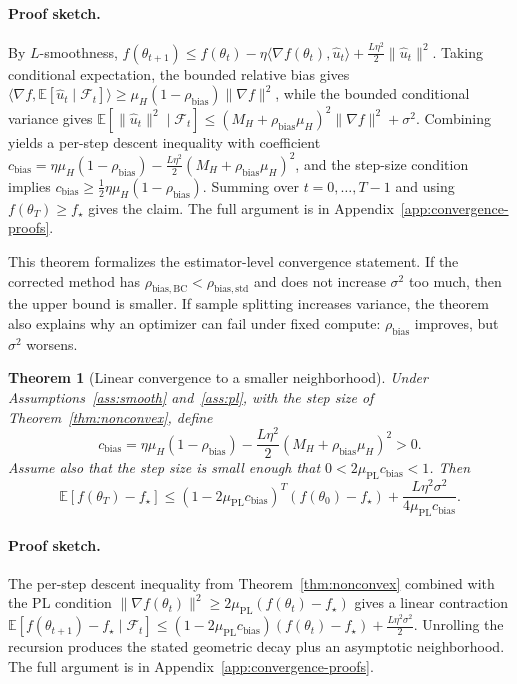\documentclass{article}
\newcommand{\E}{\mathbb{E}}
\newtheorem{theorem}{Theorem}
\begin{document}
\paragraph{Proof sketch.}
By $L$-smoothness, $f(\theta_{t+1})\le f(\theta_t)-\eta\langle\nabla f(\theta_t),\hat u_t\rangle+\frac{L\eta^2}{2}\|\hat u_t\|^2$. Taking conditional expectation, the bounded relative bias gives $\langle\nabla f,\E[\hat u_t\mid\mathcal F_t]\rangle\ge\mu_H(1-\rho_{\mathrm{bias}})\|\nabla f\|^2$, while the bounded conditional variance gives $\E[\|\hat u_t\|^2\mid\mathcal F_t]\le(M_H+\rho_{\mathrm{bias}}\mu_H)^2\|\nabla f\|^2+\sigma^2$. Combining yields a per-step descent inequality with coefficient $c_{\mathrm{bias}}=\eta\mu_H(1-\rho_{\mathrm{bias}})-\frac{L\eta^2}{2}(M_H+\rho_{\mathrm{bias}}\mu_H)^2$, and the step-size condition implies $c_{\mathrm{bias}}\ge\frac{1}{2}\eta\mu_H(1-\rho_{\mathrm{bias}})$. Summing over $t=0,\ldots,T-1$ and using $f(\theta_T)\ge f_\star$ gives the claim. The full argument is in Appendix~\ref{app:convergence-proofs}.

This theorem formalizes the estimator-level convergence statement. If the corrected method has $\rho_{\mathrm{bias},\mathrm{BC}}<\rho_{\mathrm{bias},\mathrm{std}}$ and does not increase $\sigma^2$ too much, then the upper bound is smaller. If sample splitting increases variance, the theorem also explains why an optimizer can fail under fixed compute: $\rho_{\mathrm{bias}}$ improves, but $\sigma^2$ worsens.

\begin{theorem}[Linear convergence to a smaller neighborhood]
\label{thm:pl}
Under Assumptions~\ref{ass:smooth} and~\ref{ass:pl}, with the step size of Theorem~\ref{thm:nonconvex}, define
\begin{equation}
    c_{\mathrm{bias}}
    =
    \eta\mu_H(1-\rho_{\mathrm{bias}})
    -
    \frac{L\eta^2}{2}(M_H+\rho_{\mathrm{bias}}\mu_H)^2
    >
    0.
\end{equation}
Assume also that the step size is small enough that $0<2\mu_{\mathrm{PL}}c_{\mathrm{bias}}<1$. Then
\begin{equation}
    \E[f(\theta_T)-f_\star]
    \le
    (1-2\mu_{\mathrm{PL}}c_{\mathrm{bias}})^T
    (f(\theta_0)-f_\star)
    +
    \frac{L\eta^2\sigma^2}
    {4\mu_{\mathrm{PL}}c_{\mathrm{bias}}}.
\end{equation}
\end{theorem}

\paragraph{Proof sketch.}
The per-step descent inequality from Theorem~\ref{thm:nonconvex} combined with the PL condition $\|\nabla f(\theta_t)\|^2\ge 2\mu_{\mathrm{PL}}(f(\theta_t)-f_\star)$ gives a linear contraction $\E[f(\theta_{t+1})-f_\star\mid\mathcal F_t]\le(1-2\mu_{\mathrm{PL}}c_{\mathrm{bias}})(f(\theta_t)-f_\star)+\frac{L\eta^2\sigma^2}{2}$. Unrolling the recursion produces the stated geometric decay plus an asymptotic neighborhood. The full argument is in Appendix~\ref{app:convergence-proofs}.
\end{document}
